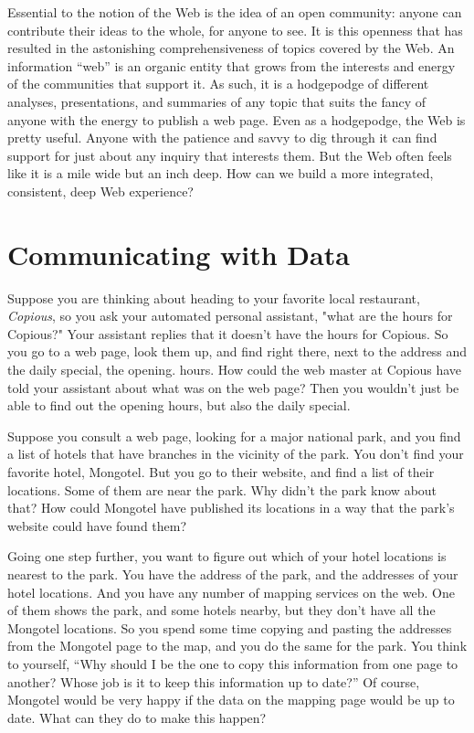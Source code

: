 Essential to the notion of the Web is the idea of an open community: anyone can contribute their ideas to the whole, 
for anyone to see. It is this openness that has resulted in the astonishing comprehensiveness of topics covered by the 
Web. An information ``web'' is an organic entity that grows from the interests and energy of the communities that 
support it. As such, it is a hodgepodge of different analyses, presentations, and summaries of any topic that 
suits the fancy of anyone with the energy to publish a web page. Even as a hodgepodge, the Web is pretty useful. 
Anyone with the patience and savvy to dig through it can find support for just about any inquiry that interests 
them. But the Web often feels like it is a mile wide but an inch deep. How can we build a more integrated, 
consistent, deep Web experience?


\section{Communicating with Data}
\label{webdata}
Suppose you are thinking about heading to your favorite local restaurant, 
\emph{Copious}, so you ask your automated personal assistant, "what are the hours for
Copious?"  Your assistant replies that it doesn't have the hours for Copious.  
So you go to a web page, look them up, and find right there, next to the 
address and the daily special, the opening. hours.  How could the web master
at Copious have told your assistant about what was on the web page?   Then you
wouldn't just be able to find out the opening hours, but also the daily special. 

 
Suppose you consult a web page, looking for a major national park, and
you find a list of hotels that have branches in the vicinity of the
park. You don't find your favorite hotel, Mongotel.  But you go to their 
website, and find a list of their locations.  Some of them are near the park. 
Why didn't the park know about that?   How could Mongotel have published its
locations in a way that the park's website could have found them? 

Going one step further, you want to figure out which of your hotel locations is 
nearest to the park.  You have the address of the park, and the addresses of 
your hotel locations.  And you have any number of mapping services on the web. 
One of them shows the park, and some hotels nearby, but they don't have all the Mongotel locations. 
So you spend some
time copying and pasting the addresses from the Mongotel page to the map, and you 
do the same for the park.  You think to yourself, ``Why should I be the one
to copy this information from one page to another? Whose job is it to keep this
information up to date?''  Of course, Mongotel would be very happy if the data on 
the mapping page would be up to date.  What can they do to make this happen? 


